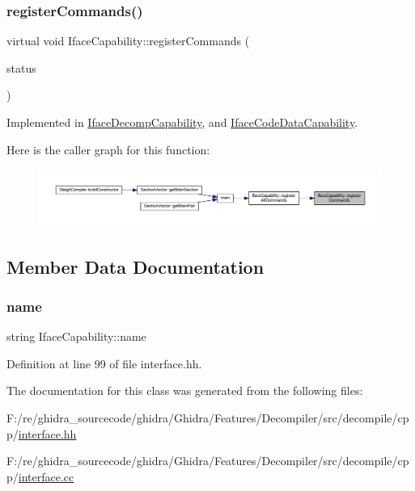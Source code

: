 \subsubsection{\texorpdfstring{registerCommands()}{registerCommands()}}
{\footnotesize\ttfamily virtual void Iface\+Capability\+::register\+Commands (\begin{DoxyParamCaption}\item[{\mbox{\hyperlink{class_iface_status}{Iface\+Status}} $\ast$}]{status }\end{DoxyParamCaption})\hspace{0.3cm}{\ttfamily [pure virtual]}}



Implemented in \mbox{\hyperlink{class_iface_decomp_capability_a9812c0648c6f50b11fccf2d262059f40}{Iface\+Decomp\+Capability}}, and \mbox{\hyperlink{class_iface_code_data_capability_a04b5ffb87bb7f88afec65a0866076b33}{Iface\+Code\+Data\+Capability}}.

Here is the caller graph for this function\+:
\nopagebreak
\begin{figure}[H]
\begin{center}
\leavevmode
\includegraphics[width=350pt]{class_iface_capability_a8ed0987e781e5213db777be93e85af6e_icgraph}
\end{center}
\end{figure}


\subsection{Member Data Documentation}
\mbox{\label{class_iface_capability_adaca15af193ff9e326a0f9f96a87e6e2}} 
\subsubsection{\texorpdfstring{name}{name}}
{\footnotesize\ttfamily string Iface\+Capability\+::name\hspace{0.3cm}{\ttfamily [protected]}}



Definition at line 99 of file interface.\+hh.



The documentation for this class was generated from the following files\+:\begin{DoxyCompactItemize}
\item 
F\+:/re/ghidra\+\_\+sourcecode/ghidra/\+Ghidra/\+Features/\+Decompiler/src/decompile/cpp/\mbox{\hyperlink{interface_8hh}{interface.\+hh}}\item 
F\+:/re/ghidra\+\_\+sourcecode/ghidra/\+Ghidra/\+Features/\+Decompiler/src/decompile/cpp/\mbox{\hyperlink{interface_8cc}{interface.\+cc}}\end{DoxyCompactItemize}

